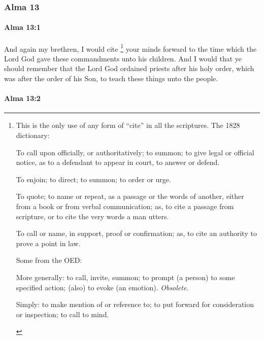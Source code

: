 	\subsubsection{Alma 13} %
		\label{ALMA-13}
		
		\paragraph{Alma 13:1} %
			\label{ALMA-13-1}

			And again my brethren, I would cite%
				\footnote{%
					This is the only use of any form of ``cite'' in all the scriptures. The 1828 dictionary:
						\begin{compactitem}
							\item[1] To call upon officially, or authoritatively; to summon; to give legal or official notice, as to a defendant to appear in court, to answer or defend.
							\item[2] To enjoin; to direct; to summon; to order or urge.
							\item[3] To quote; to name or repeat, as a passage or the words of another, either from a book or from verbal communication; as, to cite a passage from scripture, or to cite the very words a man utters.
							\item[4] To call or name, in support, proof or confirmation; as, to cite an authority to prove a point in law.
						\end{compactitem}
					Some from the OED:
						\begin{compactitem}
							\item[1.c] More generally: to call, invite, summon; to prompt (a person) to some specified action; (also) to evoke (an emotion). \textit{Obsolete}.
							\item[3] Simply: to make mention of or reference to; to put forward for consideration or inspection; to call to mind.
						\end{compactitem}
					}
			your minds forward to the time
			which the Lord God gave these commandments unto his children.
			And I would that ye should remember
			that the Lord God ordained priests after his holy order,
			which was after the order of his Son,
			to teach these things unto the people.

		\paragraph{Alma 13:2} %
			\label{ALMA-13-2}

